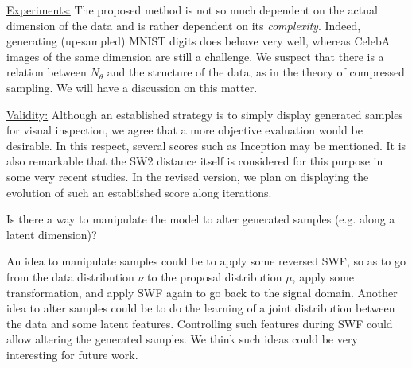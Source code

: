 \documentclass{article}
\newcommand{\rev}[1]{{\color{red} #1}}
\newcommand{\umut}[1]{{\color{blue} #1}}
\newcommand{\antoine}[1]{{\color{orange} #1}}
\begin{document}

\underline{Experiments:} The proposed method is not so much dependent on the actual dimension of the data and is rather dependent on its \textit{complexity}. Indeed, generating (up-sampled) MNIST digits does behave very well, whereas CelebA images of the same dimension are still a challenge. We suspect that there is a relation between $N_\theta$ and the structure of the data, as in the theory of compressed sampling. We will have a discussion on this matter. %


\underline{Validity:} Although an established strategy is to simply display generated samples for visual inspection, we agree that a more objective evaluation would be desirable. In this respect, several scores such as Inception may be mentioned. It is also remarkable that the SW2 distance itself is considered for this purpose in some very recent studies. In the revised version, we plan on displaying the evolution of such an established score along iterations.

\rev{Is there a way to manipulate the model to alter generated samples (e.g. along a latent dimension)?}

\antoine{An idea to manipulate samples could be to apply some reversed SWF, so as to go from the data distribution $\nu$ to the proposal distribution $\mu$, apply some transformation, and apply SWF again to go back to the signal domain. Another idea to alter samples could be to do the learning of a joint distribution between the data and some latent features. Controlling such features during SWF could allow altering the generated samples. We think such ideas could be very interesting for future work.}

\end{document}
